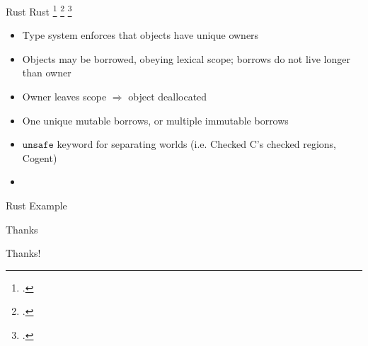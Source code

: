 \documentclass[aspectratio=169]{beamer}
\begin{document}
\begin{frame}{Rust}
    Rust \footcite{matsakis_rust_2014} \footcite{levy_ownership_2015} \footcite{jung_rustbelt:_2017}
    \begin{itemize}
        \item Type system enforces that objects have unique \alert{owners}
        \item Objects may be borrowed, obeying lexical scope; borrows do not live longer than owner
        \item Owner leaves scope $\Rightarrow$ object \alert{deallocated}
        \item One \alert{unique} mutable borrows, or multiple immutable borrows %
        \item $\texttt{unsafe}$ keyword for separating worlds (i.e. Checked C's checked regions, Cogent) %
        \item {}
    \end{itemize}
\end{frame}


\begin{frame}{Rust Example}
\end{frame}

\begin{frame}{Thanks}
    \begin{center}
        \Huge{Thanks!}
    \end{center}
\end{frame}
\end{document}

